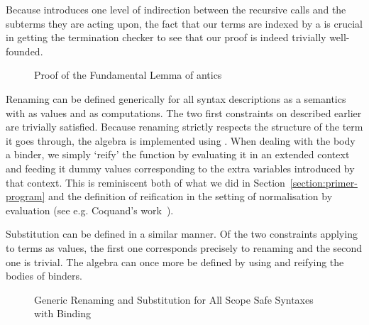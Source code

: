 Because  introduces one level of indirection between the
recursive calls and the subterms they are acting upon, the fact
that our terms are indexed by a  is crucial in getting the
termination checker to see that our proof is indeed trivially
well-founded.

\begin{figure}[h]
\begin{minipage}{0.35\textwidth}
\hspace{-2em}
\end{minipage}\hspace{2em}
\begin{minipage}{0.55\textwidth}
\end{minipage}
\caption{Proof of the Fundamental Lemma of antics}
\end{figure}

Renaming can be defined generically for all syntax descriptions as a
semantics with  as values and  as computations. The
two first constraints on  described earlier are trivially
satisfied. Because renaming strictly respects the structure of the
term it goes through, the algebra is implemented using .
When dealing with the body a binder, we simply `reify' the
 function by evaluating it in an extended context and
feeding it dummy values corresponding to the extra variables
introduced by that context. This is reminiscent both of what we
did in Section~\ref{section:primer-program} and the definition
of reification in the setting of normalisation by evaluation
(see e.g. Coquand's work~\citeyear{coquand2002formalised}).

Substitution can be defined in a similar manner. Of the two
constraints applying to terms as values, the first one corresponds
precisely to renaming and the second one is trivial. The algebra
can once more be defined by using  and reifying the bodies
of binders.

\begin{figure}[h]
\begin{minipage}{0.45\textwidth}
\end{minipage}\hspace{2em}
\begin{minipage}{0.45\textwidth}
\end{minipage}
\caption{Generic Renaming and Substitution for All Scope Safe Syntaxes with Binding}
\end{figure}

